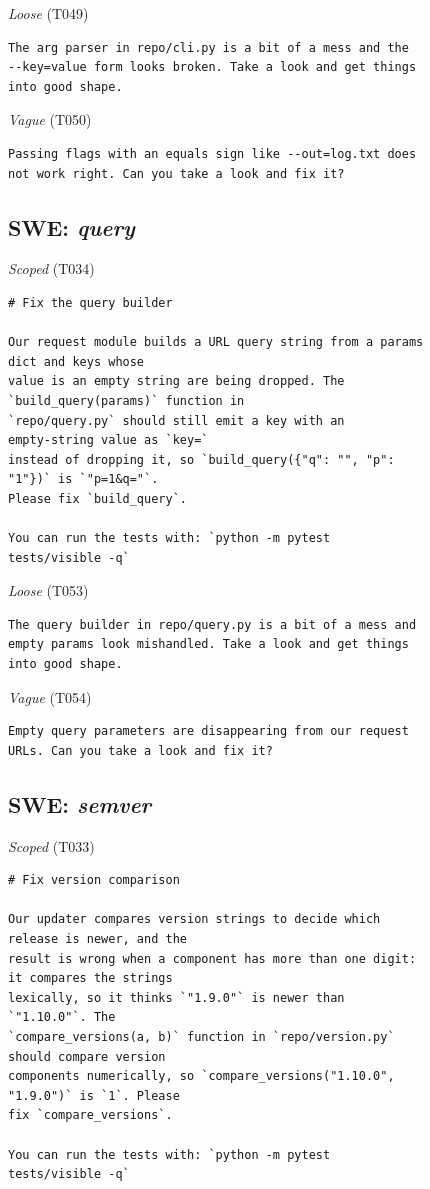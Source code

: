 \noindent\textit{Loose} (T049)
\begin{Verbatim}[fontsize=\scriptsize,frame=leftline,xleftmargin=0.5em]
The arg parser in repo/cli.py is a bit of a mess and the
--key=value form looks broken. Take a look and get things
into good shape.
\end{Verbatim}

\noindent\textit{Vague} (T050)
\begin{Verbatim}[fontsize=\scriptsize,frame=leftline,xleftmargin=0.5em]
Passing flags with an equals sign like --out=log.txt does
not work right. Can you take a look and fix it?
\end{Verbatim}

\subsection*{SWE: \emph{query}}
\noindent\textit{Scoped} (T034)
\begin{Verbatim}[fontsize=\scriptsize,frame=leftline,xleftmargin=0.5em]
# Fix the query builder

Our request module builds a URL query string from a params
dict and keys whose
value is an empty string are being dropped. The
`build_query(params)` function in
`repo/query.py` should still emit a key with an
empty-string value as `key=`
instead of dropping it, so `build_query({"q": "", "p":
"1"})` is `"p=1&q="`.
Please fix `build_query`.

You can run the tests with: `python -m pytest
tests/visible -q`
\end{Verbatim}

\noindent\textit{Loose} (T053)
\begin{Verbatim}[fontsize=\scriptsize,frame=leftline,xleftmargin=0.5em]
The query builder in repo/query.py is a bit of a mess and
empty params look mishandled. Take a look and get things
into good shape.
\end{Verbatim}

\noindent\textit{Vague} (T054)
\begin{Verbatim}[fontsize=\scriptsize,frame=leftline,xleftmargin=0.5em]
Empty query parameters are disappearing from our request
URLs. Can you take a look and fix it?
\end{Verbatim}

\subsection*{SWE: \emph{semver}}
\noindent\textit{Scoped} (T033)
\begin{Verbatim}[fontsize=\scriptsize,frame=leftline,xleftmargin=0.5em]
# Fix version comparison

Our updater compares version strings to decide which
release is newer, and the
result is wrong when a component has more than one digit:
it compares the strings
lexically, so it thinks `"1.9.0"` is newer than
`"1.10.0"`. The
`compare_versions(a, b)` function in `repo/version.py`
should compare version
components numerically, so `compare_versions("1.10.0",
"1.9.0")` is `1`. Please
fix `compare_versions`.

You can run the tests with: `python -m pytest
tests/visible -q`
\end{Verbatim}

